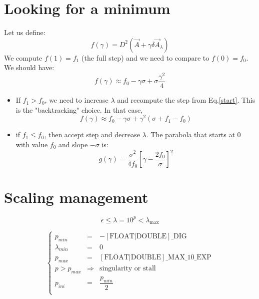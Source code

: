 \documentclass[aps,12pt]{revtex4}
\begin{document}
\section{Looking for a minimum}
Let us define:
\begin{equation}
	f(\gamma)  =  D^2(\vec{A}+\gamma \delta\vec{A}_\lambda)
\end{equation}
We compute $f(1)=f_1$ (the full step) and we need to compare to $f(0)=f_0$.
We should have:
\begin{equation}
	f(\gamma) \approx f_0 - \gamma \sigma + \sigma\dfrac{\gamma^2}{4} 
\end{equation}

\begin{itemize}
\item If $f_1>f_0$, we need to increase $\lambda$ and recompute the step from Eq.\eqref{start}. This is the "backtracking" choice.
In that case, 
\begin{equation}
		f(\gamma) \approx f_0 - \gamma \sigma + \gamma^2 \left(\sigma+f_1-f_0\right)
\end{equation}

\item if $f_1\leq f_0$, then accept step and decrease $\lambda$.
The parabola that starts at $0$ with value $f_0$ and slope $-\sigma$ is:
\begin{equation}
	g(\gamma) = \dfrac{\sigma^2}{4f_0}\left[\gamma - \dfrac{2f_0}{\sigma}\right]^2
\end{equation}
\end{itemize}

\section{Scaling management}

\begin{equation}
	\epsilon \leq \lambda = 10^p < \lambda_{\max}
\end{equation}

\begin{equation}
\left\lbrace
\begin{array}{lcl}
	p_{min}  & =  &-\mathrm{[FLOAT|DOUBLE]\_DIG}\\
	\lambda_{min} & = & 0\\
 	\hline
	p_{max} & = &  \mathrm{[FLOAT|DOUBLE]\_MAX\_10\_EXP}\\
	p>p_{max}& \Rightarrow & \text{singularity or stall}\\
	\hline
	p_{ini} & = & \dfrac{p_{min}}{2}\\
\end{array}
\right.
\end{equation}
\end{document}
